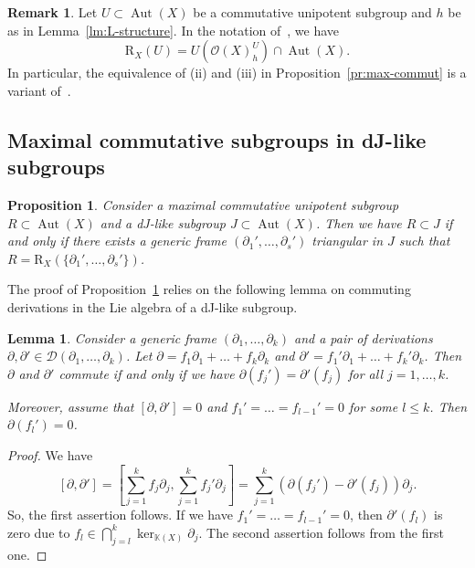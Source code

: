 \documentclass[12pt,a4paper]{amsart}
\theoremstyle{plain}
\newtheorem{lemma}[theorem]{Lemma}
\newtheorem{proposition}[theorem]{Proposition}
\theoremstyle{definition}
\newtheorem{remark}[theorem]{Remark}
\theoremstyle{remark}
\def\Aut{\operatorname{Aut}}
\def\K{{\mathbb K}}
\def\cO{{\mathcal O}}
\begin{document}
   \begin{remark}
       Let $U\subset \Aut(X)$ be a commutative unipotent subgroup  and $h$ be as in Lemma~\ref{lm:L-structure}. In the notation of~\cite[Section 10.4]{FK}, we have
      \[
         \mathrm{R}_X(U) = U(\cO(X)_h^U) \cap \Aut(X).
      \]
      In particular, the equivalence of (ii) and (iii) in Proposition~\ref{pr:max-commut} is a variant of~\cite[Proposition~10.4.12]{FK}.
   \end{remark}


\subsection{Maximal commutative subgroups in dJ-like subgroups}



      
\begin{proposition}\label{pr:R<J}
   Consider a maximal commutative unipotent subgroup $R\subset\Aut(X)$ and a dJ-like subgroup $J\subset\Aut(X)$.
   Then we have $R\subset J$ if and only if there exists
   a generic frame $(\partial_1',\ldots,\partial_s')$ triangular in $J$ such that $R=\mathrm{R}_X(\{\partial_1',\ldots,\partial_s'\})$.
\end{proposition}

The proof of Proposition~\ref{pr:R<J} relies on the following lemma on commuting derivations in the Lie algebra of a dJ-like subgroup.
\begin{lemma}\label{lm:commuting-pair}
   Consider a generic frame $(\partial_1,\ldots,\partial_k)$ and a pair of derivations $\partial,\partial'\in\mathcal{D}(\partial_1,\ldots,\partial_k)$. 
   Let $\partial=f_1\partial_1+\ldots+f_k\partial_k$ and $\partial'=f_1'\partial_1+\ldots+f_k'\partial_k$. 
   Then $\partial$ and $\partial'$ commute if and only if we have $\partial(f_j') = \partial'(f_j)$ for all $j=1,\ldots,k$.

   Moreover, assume that $[\partial,\partial']=0$ and $f_1'=\ldots=f_{l-1}'=0$ for some $l\le k$. Then $\partial(f_l')=0$.
\end{lemma}
\begin{proof}
  We have
   \[
      [\partial,\partial']=\left[\sum_{j=1}^k f_j\partial_j,\sum_{j=1}^k f_j'\partial_j\right]=\sum_{j=1}^k \left(
         \partial(f_j') - \partial'(f_j)
       \right)\partial_j.
   \]
   So, the first assertion follows.
   If we have $f_1'=\ldots=f_{l-1}'=0$, then $\partial'(f_l)$ is zero due to $f_l\in\bigcap_{j=l}^k \ker_{\K(X)}\partial_j$.
   The second assertion follows from the first one.
\end{proof}
\end{document}
